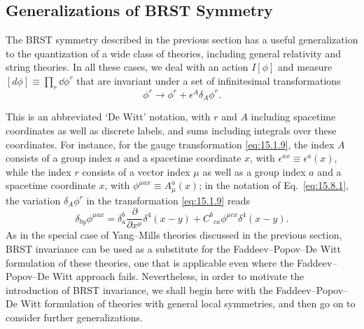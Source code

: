 \subsection[Generalizations of BRST Symmetry]{Generalizations of BRST Symmetry\footnotemark}

The BRST symmetry described in the previous section has a useful generalization to the quantization of a wide class of theories, including general relativity and string theories. In all these cases, we deal with an action $I[\phi]$ and measure $[d\phi]\equiv\prod_r \dd\phi^r$ that are invariant under a set of infinitesimal transformations
\begin{equation}
 \phi^r\longrightarrow\phi^r+\epsilon^A\delta_A\phi^r.
 \tag{15.8.1}\label{eq:15.8.1}
\end{equation}

This is an abbreviated `De Witt' notation, with $r$ and $A$ including spacetime coordinates as well as discrete labels, and sums including integrals over these coordinates. For instance, for the gauge transformation \eqref{eq:15.1.9}, the index $A$ consists of a group index $a$ and a spacetime coordinate $x$, with $\epsilon^{a x}\equiv\epsilon^a(x)$, while the index $r$ consists of a vector index $\mu$ as well as a group index $a$ and a spacetime coordinate $x$, with $\phi^{\mu a x}\equiv A_\mu^a(x)$; in the notation of Eq.~\eqref{eq:15.8.1}, the variation $\delta_A\phi^r$ in the transformation \eqref{eq:15.1.9} reads
\[
 \delta_{b y}\phi^{\mu a x}
 =\delta_a^b\frac{\partial}{\partial x^\mu}\delta^4(x-y)
 +C^b{}_{ca}\phi^{\mu c x}\delta^4(x-y).
\]
As in the special case of Yang--Mills theories discussed in the previous section, BRST invariance can be used as a substitute for the Faddeev--Popov--De Witt formulation of these theories, one that is applicable even where the Faddeev--Popov--De Witt approach fails. Nevertheless, in order to motivate the introduction of BRST invariance, we shall begin here with the Faddeev--Popov--De Witt formulation of theories with general local symmetries, and then go on to consider further generalizations.

